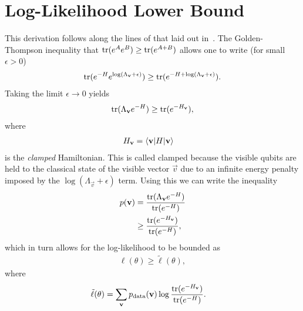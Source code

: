 \section{Log-Likelihood Lower Bound}\label{app:qbm_log_likelihood_lower_bound}
This derivation follows along the lines of that laid out in~\cite{amin_2018}.
The Golden-Thompson inequality that \( \text{tr}(e^{A}e^{B}) \ge \text{tr}(e^{A+B}) \) allows one to write (for small \( \epsilon > 0 \))
\begin{align}
    \text{tr}(e^{-H} e^{\log(\Lambda_{\mathbf{v}}+\epsilon)}) \ge \text{tr}(e^{-H+\log(\Lambda_{\mathbf{v}}+\epsilon)}).
\end{align}
Taking the limit \( \epsilon \rightarrow 0 \) yields
\begin{align}
    \text{tr}(\Lambda_{\mathbf{v}}e^{-H}) \ge \text{tr}(e^{-H_{\mathbf{v}}}),
\end{align}
where
\begin{align}
    H_{\mathbf{v}} &= \braket{\mathbf{v} | H | \mathbf{v}}
\end{align}
is the \textit{clamped} Hamiltonian.
This is called clamped because the visible qubits are held to the classical state of the visible vector \( \vec{v} \) due to an infinite energy penalty imposed by the \( \log(\Lambda_\vec{v} + \epsilon) \) term.
Using this we can write the inequality
\begin{align}
\begin{split}
    p(\mathbf{v})
        &= \frac{\text{tr}(\Lambda_{\mathbf{v}} e^{-H})}{\text{tr}(e^{-H})} \\
        &\ge \frac{\text{tr}(e^{-H_{\mathbf{v}}})}{\text{tr}(e^{-H})},
\end{split}
\end{align}
which in turn allows for the log-likelihood to be bounded as
\begin{align}
    \ell(\theta) \ge \tilde{\ell}(\theta),
\end{align}
where
\begin{align}
    \tilde{\ell}(\theta)
        &= \sum_{\mathbf{v}} p_\text{data}(\mathbf{v}) \log\frac{\text{tr}(e^{-H_{\mathbf{v}}})}{\text{tr}(e^{-H})}.
\end{align}
